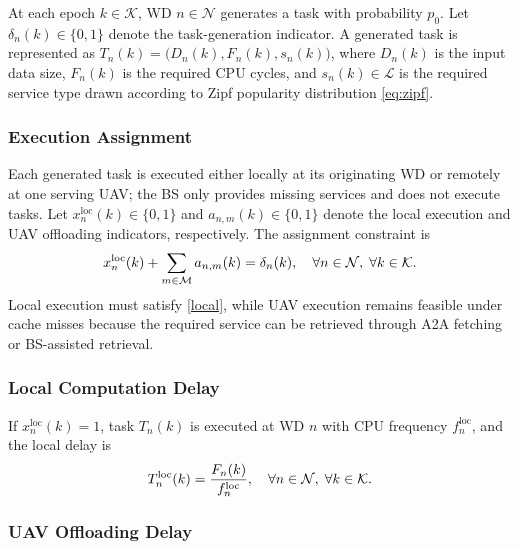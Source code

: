 \documentclass[journal]{IEEEtran}
\begin{document}
At each epoch $k\in\mathcal{K}$, WD $n\in\mathcal{N}$ generates a task with probability $p_0$. Let $\delta_n(k)\in\{0,1\}$ denote the task-generation indicator. A generated task is represented as
$T_n(k)=\bigl(D_n(k),F_n(k),s_n(k)\bigr)$, where $D_n(k)$ is the input data size, $F_n(k)$ is the required CPU cycles, and $s_n(k)\in\mathcal{L}$ is the required service type drawn according to Zipf popularity distribution \eqref{eq:zipf}.


\subsubsection{Execution Assignment}

Each generated task is executed either locally at its originating WD or remotely at one serving UAV; the BS only provides missing services and does not execute tasks. Let $x_n^{\mathrm{loc}}(k)\in\{0,1\}$ and $a_{n,m}(k)\in\{0,1\}$ denote the local execution and UAV offloading indicators, respectively. The assignment constraint is
\begin{equation}
\small
    x_n^{\mathrm{loc}}(k)+\sum_{m\in\mathcal{M}}a_{n,m}(k)
    = \delta_n(k),
    \quad \forall n\in\mathcal{N},\;\forall k\in\mathcal{K}.
    \label{eq:exec_assign}
\end{equation}
Local execution must satisfy \eqref{local}, while UAV execution remains feasible under cache misses because the required service can be retrieved through A2A fetching or BS-assisted retrieval.

\subsubsection{Local Computation Delay}

If $x_n^{\mathrm{loc}}(k)=1$, task $T_n(k)$ is executed at WD $n$ with CPU frequency $f_n^{\mathrm{loc}}$, and the local delay is
\begin{equation}
\small
    T_n^{\mathrm{loc}}(k)=\frac{F_n(k)}{f_n^{\mathrm{loc}}},
    \quad \forall n\in\mathcal{N},\;\forall k\in\mathcal{K}.
    \label{eq:local_delay}
\end{equation}

\subsubsection{UAV Offloading Delay}
\end{document}
